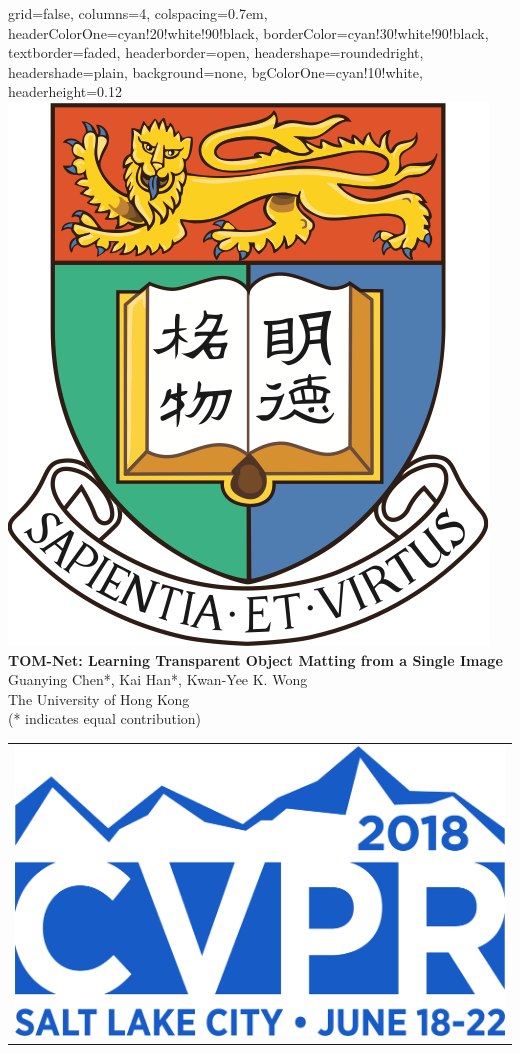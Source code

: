 \documentclass[landscape,a0paper,fontscale=0.292]{baposter}
\begin{document}
\begin{poster}{
 grid=false,
 columns=4,
 colspacing=0.7em,
 headerColorOne=cyan!20!white!90!black,
 borderColor=cyan!30!white!90!black,
 textborder=faded,
 headerborder=open,
 headershape=roundedright,
 headershade=plain,
 background=none,
 bgColorOne=cyan!10!white,
 headerheight=0.12\textheight}
 {
      \includegraphics[width=0.08\linewidth]{HKU_logo}
      \makebox[0.04\textwidth]{} 
 }
 {\sc\huge\bf TOM-Net: Learning Transparent Object Matting from a Single Image}
 {\vspace{0.3em} Guanying Chen*, Kai Han*, Kwan-Yee K. Wong \\[0.2em]
 {The University of Hong Kong \\[0.2em] (* indicates equal contribution)}}
 {
  \begin{tabular}{r}
    \includegraphics[width=0.12\linewidth]{cvpr18logo_3.jpg}
  \end{tabular}
 }



\end{poster}
\end{document}
